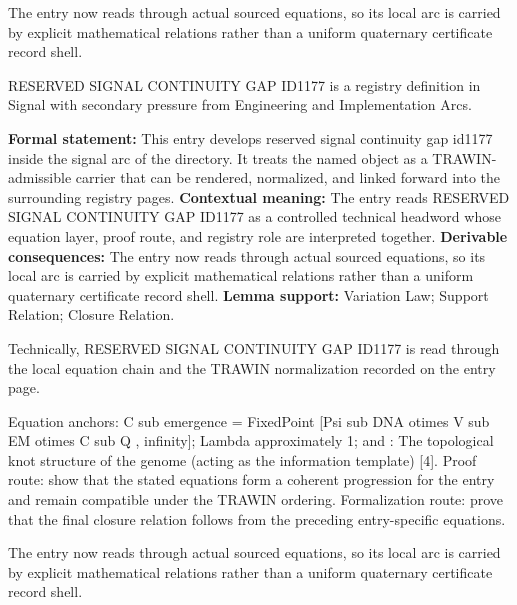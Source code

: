 The entry now reads through actual sourced equations, so its local arc is carried by explicit mathematical relations rather than a uniform quaternary certificate record shell.
\clearpage


\begingroup\small
{}
RESERVED SIGNAL CONTINUITY GAP ID1177 is a registry definition in Signal with secondary pressure from Engineering and Implementation Arcs.

\begingroup\footnotesize\setlength{\emergencystretch}{3em}\sloppy
\textbf{Formal statement:} This entry develops reserved signal continuity gap id1177 inside the signal arc of the directory. It treats the named object as a TRAWIN-admissible carrier that can be rendered, normalized, and linked forward into the surrounding registry pages. \textbf{Contextual meaning:} The entry reads RESERVED SIGNAL CONTINUITY GAP ID1177 as a controlled technical headword whose equation layer, proof route, and registry role are interpreted together. \textbf{Derivable consequences:} The entry now reads through actual sourced equations, so its local arc is carried by explicit mathematical relations rather than a uniform quaternary certificate record shell. \textbf{Lemma support:} Variation Law; Support Relation; Closure Relation.\par
\endgroup

Technically, RESERVED SIGNAL CONTINUITY GAP ID1177 is read through the local equation chain and the TRAWIN normalization recorded on the entry page.

Equation anchors: C sub emergence = FixedPoint [Psi sub DNA otimes V sub EM otimes C sub Q , infinity]; Lambda approximately 1; and : The topological knot structure of the genome (acting as the information template) [4]. Proof route: show that the stated equations form a coherent progression for the entry and remain compatible under the TRAWIN ordering. Formalization route: prove that the final closure relation follows from the preceding entry-specific equations.

The entry now reads through actual sourced equations, so its local arc is carried by explicit mathematical relations rather than a uniform quaternary certificate record shell.
\endgroup

